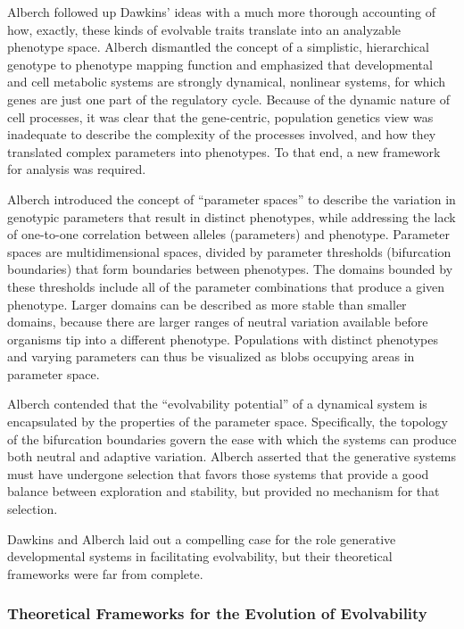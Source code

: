 Alberch followed up Dawkins’ ideas with a much more thorough accounting of how, exactly, these kinds of evolvable traits translate into an analyzable phenotype space. Alberch dismantled the concept of a simplistic, hierarchical genotype to phenotype mapping function and emphasized that developmental and cell metabolic systems are strongly dynamical, nonlinear systems, for which genes are just one part of the regulatory cycle. Because of the dynamic nature of cell processes, it was clear that the gene-centric, population genetics view was inadequate to describe the complexity of the processes involved, and how they translated complex parameters into phenotypes. To that end, a new framework for analysis was required.

Alberch introduced the concept of “parameter spaces” to describe the variation in genotypic parameters that result in distinct phenotypes, while addressing the lack of one-to-one correlation between alleles (parameters) and phenotype. Parameter spaces are multidimensional spaces, divided by parameter thresholds (bifurcation boundaries) that form boundaries between phenotypes.  The domains bounded by these thresholds include all of the parameter combinations that produce a given phenotype. Larger domains can be described as more stable than smaller domains, because there are larger ranges of neutral variation available before organisms tip into a different phenotype. Populations with distinct phenotypes and varying parameters can thus be visualized as blobs occupying areas in parameter space.

Alberch contended that the “evolvability potential” of a dynamical system is encapsulated by the properties of the parameter space. Specifically, the topology of the bifurcation boundaries govern the ease with which the systems can produce both neutral and adaptive variation. Alberch asserted that the generative systems must have undergone selection that favors those systems that provide a good balance between exploration and stability, but provided no mechanism for that selection.

Dawkins and Alberch laid out a compelling case for the role generative developmental systems in facilitating evolvability, but their theoretical frameworks were far from complete.

\subsubsection{Theoretical Frameworks for the Evolution of Evolvability}

